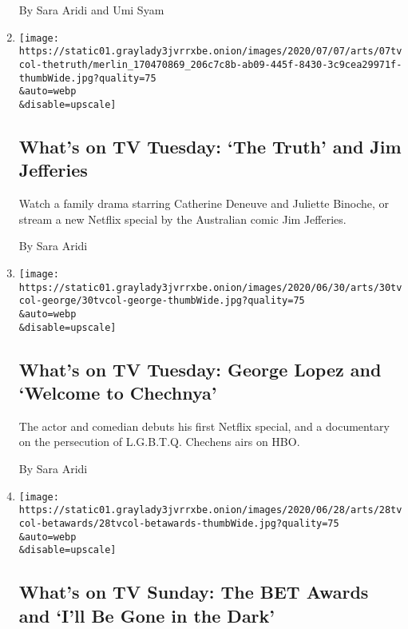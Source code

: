 \begin{enumerate}
  By Sara Aridi and Umi Syam
\item
  \href{/2020/07/07/arts/television/whats-on-tv-tuesday-the-truth-and-jim-jefferies.html}{}

  \texttt{[image: https://static01.graylady3jvrrxbe.onion/images/2020/07/07/arts/07tvcol-thetruth/merlin\_170470869\_206c7c8b-ab09-445f-8430-3c9cea29971f-thumbWide.jpg?quality=75\\\&auto=webp\\\&disable=upscale]}

  \hypertarget{whats-on-tv-tuesday-the-truth-and-jim-jefferies}{%
  \subsection{What's on TV Tuesday: `The Truth' and Jim
  Jefferies}\label{whats-on-tv-tuesday-the-truth-and-jim-jefferies}}

  Watch a family drama starring Catherine Deneuve and Juliette Binoche,
  or stream a new Netflix special by the Australian comic Jim Jefferies.

  By Sara Aridi
\item
  \href{/2020/06/30/arts/television/whats-on-tv-tuesday-george-lopez-and-welcome-to-chechnya.html}{}

  \texttt{[image: https://static01.graylady3jvrrxbe.onion/images/2020/06/30/arts/30tvcol-george/30tvcol-george-thumbWide.jpg?quality=75\\\&auto=webp\\\&disable=upscale]}

  \hypertarget{whats-on-tv-tuesday-george-lopez-and-welcome-to-chechnya}{%
  \subsection{What's on TV Tuesday: George Lopez and `Welcome to
  Chechnya'}\label{whats-on-tv-tuesday-george-lopez-and-welcome-to-chechnya}}

  The actor and comedian debuts his first Netflix special, and a
  documentary on the persecution of L.G.B.T.Q. Chechens airs on HBO.

  By Sara Aridi
\item
  \href{/2020/06/28/arts/television/whats-on-tv-sunday-the-bet-awards-and-ill-be-gone-in-the-dark.html}{}

  \texttt{[image: https://static01.graylady3jvrrxbe.onion/images/2020/06/28/arts/28tvcol-betawards/28tvcol-betawards-thumbWide.jpg?quality=75\\\&auto=webp\\\&disable=upscale]}

  \hypertarget{whats-on-tv-sunday-the-bet-awards-and-ill-be-gone-in-the-dark}{%
  \subsection{What's on TV Sunday: The BET Awards and `I'll Be Gone in
  the
  Dark'}\label{whats-on-tv-sunday-the-bet-awards-and-ill-be-gone-in-the-dark}}


\end{enumerate}
